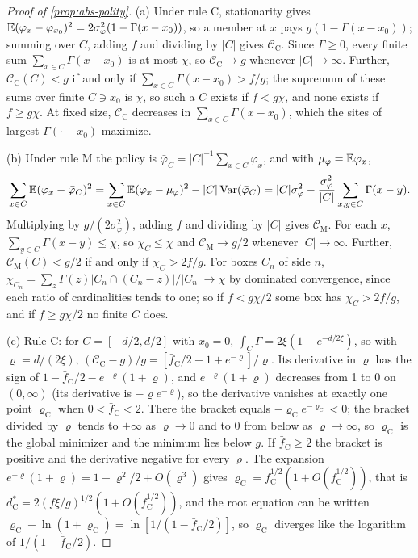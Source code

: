 \begin{proof}[Proof of \cref{prop:abs-polity}]
(a) Under rule C, stationarity gives $\mathbb{E}(\varphi_x-\varphi_{x_0})^2=2\sigma_\varphi^2(1-\Gamma(x-x_0))$, so a member at $x$ pays $g(1-\Gamma(x-x_0))$; summing over $C$, adding $f$ and dividing by $\lvert C\rvert$ gives $\mathcal C_{\mathrm C}$. Since $\Gamma\ge0$, every finite sum $\sum_{x\in C}\Gamma(x-x_0)$ is at most $\chi$, so $\mathcal C_{\mathrm C}\to g$ whenever $\lvert C\rvert\to\infty$. Further, $\mathcal C_{\mathrm C}(C)<g$ if and only if $\sum_{x\in C}\Gamma(x-x_0)>f/g$; the supremum of these sums over finite $C\ni x_0$ is $\chi$, so such a $C$ exists if $f<g\chi$, and none exists if $f\ge g\chi$. At fixed size, $\mathcal C_{\mathrm C}$ decreases in $\sum_{x\in C}\Gamma(x-x_0)$, which the sites of largest $\Gamma(\cdot-x_0)$ maximize.

(b) Under rule M the policy is $\bar\varphi_C=\lvert C\rvert^{-1}\sum_{x\in C}\varphi_x$, and with $\mu_\varphi=\mathbb{E}\varphi_x$,
\[
\sum_{x\in C}\mathbb{E}(\varphi_x-\bar\varphi_C)^2=\sum_{x\in C}\mathbb{E}(\varphi_x-\mu_\varphi)^2-\lvert C\rvert\operatorname{Var}(\bar\varphi_C)=\lvert C\rvert\sigma_\varphi^2-\frac{\sigma_\varphi^2}{\lvert C\rvert}\sum_{x,y\in C}\Gamma(x-y).
\]
Multiplying by $g/(2\sigma_\varphi^2)$, adding $f$ and dividing by $\lvert C\rvert$ gives $\mathcal C_{\mathrm M}$. For each $x$, $\sum_{y\in C}\Gamma(x-y)\le\chi$, so $\chi_C\le\chi$ and $\mathcal C_{\mathrm M}\to g/2$ whenever $\lvert C\rvert\to\infty$. Further, $\mathcal C_{\mathrm M}(C)<g/2$ if and only if $\chi_C>2f/g$. For boxes $C_n$ of side $n$, $\chi_{C_n}=\sum_z\Gamma(z)\lvert C_n\cap(C_n-z)\rvert/\lvert C_n\rvert\to\chi$ by dominated convergence, since each ratio of cardinalities tends to one; so if $f<g\chi/2$ some box has $\chi_C>2f/g$, and if $f\ge g\chi/2$ no finite $C$ does.

(c) Rule C: for $C=[-d/2,d/2]$ with $x_0=0$, $\int_C\Gamma=2\xi(1-e^{-d/2\xi})$, so with $\varrho=d/(2\xi)$, $(\mathcal C_{\mathrm C}-g)/g=[\bar f_{\mathrm C}/2-1+e^{-\varrho}]/\varrho$. Its derivative in $\varrho$ has the sign of $1-\bar f_{\mathrm C}/2-e^{-\varrho}(1+\varrho)$, and $e^{-\varrho}(1+\varrho)$ decreases from 1 to 0 on $(0,\infty)$ (its derivative is $-\varrho e^{-\varrho}$), so the derivative vanishes at exactly one point $\varrho_{\mathrm C}$ when $0<\bar f_{\mathrm C}<2$. There the bracket equals $-\varrho_{\mathrm C}e^{-\varrho_{\mathrm C}}<0$; the bracket divided by $\varrho$ tends to $+\infty$ as $\varrho\to0$ and to $0$ from below as $\varrho\to\infty$, so $\varrho_{\mathrm C}$ is the global minimizer and the minimum lies below $g$. If $\bar f_{\mathrm C}\ge2$ the bracket is positive and the derivative negative for every $\varrho$. The expansion $e^{-\varrho}(1+\varrho)=1-\varrho^2/2+O(\varrho^3)$ gives $\varrho_{\mathrm C}=\bar f_{\mathrm C}^{1/2}(1+O(\bar f_{\mathrm C}^{1/2}))$, that is $d^\ast_{\mathrm C}=2(f\xi/g)^{1/2}(1+O(\bar f_{\mathrm C}^{1/2}))$, and the root equation can be written $\varrho_{\mathrm C}-\ln(1+\varrho_{\mathrm C})=\ln[1/(1-\bar f_{\mathrm C}/2)]$, so $\varrho_{\mathrm C}$ diverges like the logarithm of $1/(1-\bar f_{\mathrm C}/2)$.


\end{proof}
